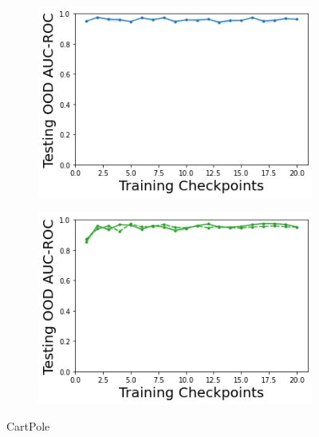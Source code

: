 \begin{figure}
\begin{subfigure}{.24\textwidth}
        \includegraphics[width=\textwidth]{sections/011_icml2022/resources/DKL-CartPoleOOD-v0-AUC-ROC-epistemic_-testing-strategy.png}
    \end{subfigure}
    \begin{subfigure}{.24\textwidth}
        \includegraphics[width=\textwidth]{sections/011_icml2022/resources/PostNet-CartPoleOOD-v0-AUC-ROC-epistemic_-testing-strategy.png}
    \end{subfigure}
    \vspace{-3mm}
    \caption*{CartPole}
    \vspace{2mm}


\end{figure}
